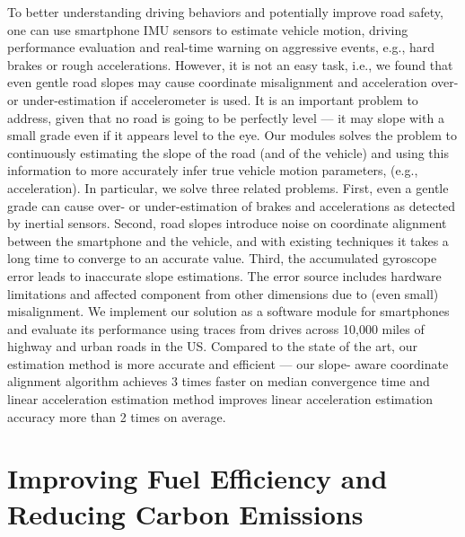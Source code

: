 To better understanding driving behaviors and potentially
improve road safety, 
one can use smartphone IMU sensors to estimate vehicle motion, driving
performance evaluation and real-time warning on aggressive
events, e.g., hard brakes or rough accelerations. 
However, it is not an easy task, 
i.e., we found that even gentle road slopes may cause 
coordinate misalignment and acceleration over- or under-estimation
if accelerometer is used. 
It is an important problem
to address, given that no road is going to be perfectly level
— it may slope with a small grade even if it appears level
to the eye. Our modules solves the problem to continuously
estimating the slope of the road (and of the vehicle) and using
this information to more accurately infer true vehicle motion
parameters, (e.g., acceleration). In particular, we solve three
related problems. First, even a gentle grade can cause over-
or under-estimation of brakes and accelerations as detected
by inertial sensors. Second, road slopes introduce noise on
coordinate alignment between the smartphone and the vehicle,
and with existing techniques it takes a long time to converge to an
accurate value. Third, the accumulated gyroscope error leads to
inaccurate slope estimations. The error source includes hardware
limitations and affected component from other dimensions due
to (even small) misalignment. We implement our solution as a
software module for smartphones and evaluate its performance
using traces from drives across 10,000 miles of highway and
urban roads in the US. Compared to the state of the art, our
estimation method is more accurate and efficient — our slope-
aware coordinate alignment algorithm achieves 3 times faster
on median convergence time and linear acceleration estimation
method improves linear acceleration estimation accuracy more
than 2 times on average.

\section{Improving Fuel Efficiency and Reducing Carbon Emissions}

